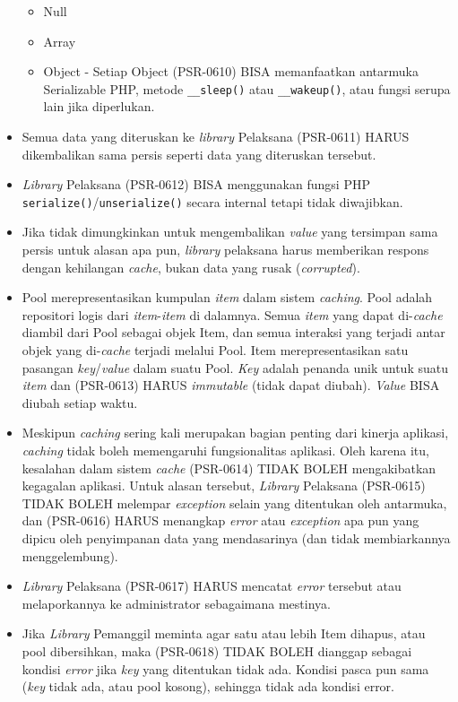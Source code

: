 \begin{itemize}
\begin{itemize}
		\item Null
		\item Array
		\item Object - Setiap Object (PSR-0610) BISA memanfaatkan antarmuka Serializable PHP, metode \verb|__sleep()| atau \verb|__wakeup()|, atau fungsi serupa lain jika diperlukan.
	\end{itemize}
	\item Semua data yang diteruskan ke \textit{library} Pelaksana (PSR-0611) HARUS dikembalikan sama persis seperti data yang diteruskan tersebut.
	\item \textit{Library} Pelaksana (PSR-0612) BISA menggunakan fungsi PHP \verb|serialize()|/\verb|unserialize()| secara internal tetapi tidak diwajibkan.
	\item Jika tidak dimungkinkan untuk mengembalikan \textit{value} yang tersimpan sama persis untuk alasan apa pun, \textit{library} pelaksana harus memberikan respons dengan kehilangan \textit{cache}, bukan data yang rusak (\textit{corrupted}).
	\item Pool merepresentasikan kumpulan \textit{item} dalam sistem \textit{caching}. Pool adalah repositori logis dari \textit{item}-\textit{item} di dalamnya. Semua \textit{item} yang dapat di-\textit{cache} diambil dari Pool sebagai objek Item, dan semua interaksi yang terjadi antar objek yang di-\textit{cache} terjadi melalui Pool.
	Item merepresentasikan satu pasangan \textit{key}/\textit{value} dalam suatu Pool. \textit{Key} adalah penanda unik untuk suatu \textit{item} dan (PSR-0613) HARUS \textit{immutable} (tidak dapat diubah). \textit{Value} BISA diubah setiap waktu.
	\item Meskipun \textit{caching} sering kali merupakan bagian penting dari kinerja aplikasi, \textit{caching} tidak boleh memengaruhi fungsionalitas aplikasi. Oleh karena itu, kesalahan dalam sistem \textit{cache} (PSR-0614) TIDAK BOLEH mengakibatkan kegagalan aplikasi. Untuk alasan tersebut, \textit{Library}  Pelaksana (PSR-0615) TIDAK BOLEH melempar \textit{exception} selain yang ditentukan oleh antarmuka, dan (PSR-0616) HARUS menangkap \textit{error} atau \textit{exception} apa pun yang dipicu oleh penyimpanan data yang mendasarinya (dan tidak membiarkannya menggelembung).
	\item \textit{Library} Pelaksana (PSR-0617) HARUS mencatat \textit{error} tersebut atau melaporkannya ke administrator sebagaimana mestinya.
	\item Jika \textit{Library} Pemanggil meminta agar satu atau lebih Item dihapus, atau pool dibersihkan, maka (PSR-0618) TIDAK BOLEH dianggap sebagai kondisi \textit{error} jika \textit{key} yang ditentukan tidak ada. Kondisi pasca pun sama (\textit{key} tidak ada, atau pool kosong), sehingga tidak ada kondisi error.
\end{itemize}

